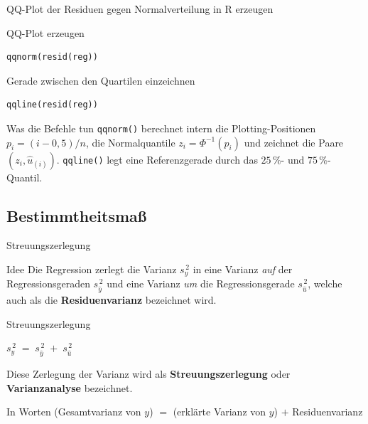 \documentclass[aspectratio=169,11pt]{beamer}
\begin{document}
\begin{frame}[fragile]{QQ-Plot der Residuen gegen Normalverteilung in R erzeugen}
  \begin{block}{QQ-Plot erzeugen}
\begin{lstlisting}
qqnorm(resid(reg))
\end{lstlisting}
  \end{block}

  \begin{block}{Gerade zwischen den Quartilen einzeichnen}
\begin{lstlisting}
qqline(resid(reg))
\end{lstlisting}
  \end{block}

  \begin{exampleblock}{Was die Befehle tun}
    \texttt{qqnorm()} berechnet intern die Plotting-Positionen
    $p_i = (i-0{,}5)/n$, die Normalquantile
    $z_i = \Phi^{-1}(p_i)$ und zeichnet die Paare
    $(z_i, \hat{u}_{(i)})$. \texttt{qqline()} legt eine
    Referenzgerade durch das $25\,\%$- und $75\,\%$-Quantil.
  \end{exampleblock}
\end{frame}

\subsection{Bestimmtheitsmaß}

\begin{frame}{Streuungszerlegung}
  \begin{block}{Idee}
    Die Regression zerlegt die Varianz $s_y^{\,2}$ in eine Varianz
    \emph{auf} der Regressionsgeraden $s_{\hat{y}}^{\,2}$ und eine
    Varianz \emph{um} die Regressionsgerade $s_{\hat{u}}^{\,2}$,
    welche auch als die \textbf{Residuenvarianz} bezeichnet wird.
  \end{block}

  \begin{exampleblock}{Streuungszerlegung}
    \begin{center}
      $\displaystyle s_y^{\,2} \;=\; s_{\hat{y}}^{\,2} \;+\; s_{\hat{u}}^{\,2}$
    \end{center}
    Diese Zerlegung der Varianz wird als \textbf{Streuungszerlegung}
    oder \textbf{Varianzanalyse} bezeichnet.
  \end{exampleblock}

  \begin{block}{In Worten}
    (Gesamtvarianz von $y$) $=$ (erklärte Varianz von $y$) $+$
    Residuenvarianz
  \end{block}
\end{frame}
\end{document}
